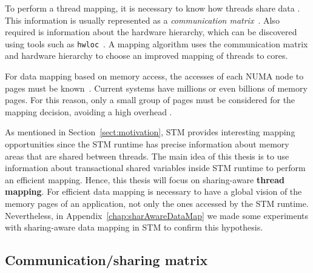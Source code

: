 To perform a thread mapping, it is necessary to know how threads share data \cite{Diener:2016Sur}. This information is usually represented as a \emph{communication matrix}~\cite{Bordage:2018}. Also required is information about the hardware hierarchy, which can be discovered using tools such as \texttt{hwloc}~\cite{hwloc}. A mapping algorithm uses the communication matrix and hardware hierarchy to choose an improved mapping of threads to cores.

For data mapping based on memory access, the accesses of each NUMA node to  pages must be known~\cite{Cruz:2018}. Current systems have millions or even billions of memory pages. For this reason, only a small group of pages must be considered for the mapping decision, avoiding a high overhead \cite{Diener:2016Sur}.

As mentioned in Section~\ref{sect:motivation}, STM provides interesting mapping opportunities since the STM runtime has precise information about memory areas that are shared between threads. The main idea of this thesis is to use information about transactional shared variables inside STM runtime to perform an efficient mapping. Hence, this thesis will focus on sharing-aware \textbf{thread mapping}. For efficient data mapping is necessary to have a global vision of the memory pages of an application, not only the ones accessed by the STM runtime. Nevertheless, in Appendix~\ref{chap:sharAwareDataMap} we made some experiments with sharing-aware data mapping in STM to confirm this hypothesis.

\subsection{Communication/sharing matrix}\label{sect:commMatrix}

